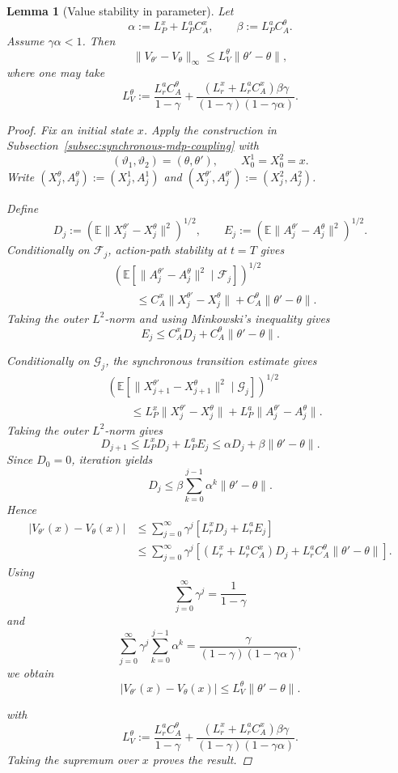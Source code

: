 \documentclass{article}
\newtheorem{lem}[thm]{Lemma}
\theoremstyle{definition}
\theoremstyle{remark}
\theoremstyle{mystyle}
\newcommand{\1}{\mathbbm{1}}
\begin{document}
\begin{lem}[Value stability in parameter]
Let
\[
\alpha:=L_P^x+L_P^aC_A^x,
\qquad
\beta:=L_P^aC_A^\theta.
\]
Assume \(\gamma\alpha<1\). Then
\[
\|V_{\theta'}-V_\theta\|_\infty
\le
L_V^\theta\|\theta'-\theta\|,
\tag{Vtheta}
\]
where one may take
\[
L_V^\theta
:=
\frac{L_r^aC_A^\theta}{1-\gamma}
+
\frac{(L_r^x+L_r^aC_A^x)\beta\gamma}
{(1-\gamma)(1-\gamma\alpha)}.
\]

\begin{proof}
Fix an initial state \(x\). Apply the construction in
Subsection~\ref{subsec:synchronous-mdp-coupling} with
\[
(\vartheta_1,\vartheta_2)=(\theta,\theta'),
\qquad
X_0^1=X_0^2=x.
\]
Write \((X_j^\theta,A_j^\theta):=(X_j^1,A_j^1)\) and
\((X_j^{\theta'},A_j^{\theta'}):=(X_j^2,A_j^2)\).

Define
\[
D_j:=
\left(\mathbb E\|X_j^{\theta'}-X_j^\theta\|^2\right)^{1/2},
\qquad
E_j:=
\left(\mathbb E\|A_j^{\theta'}-A_j^\theta\|^2\right)^{1/2}.
\]
Conditionally on \(\mathcal F_j\), action-path stability at \(t=T\)
gives
\[
\begin{aligned}
&\left(
\mathbb E\left[
\|A_j^{\theta'}-A_j^\theta\|^2
\mid\mathcal F_j
\right]
\right)^{1/2}
\\
&\qquad\le
C_A^x\|X_j^{\theta'}-X_j^\theta\|
+
C_A^\theta\|\theta'-\theta\|.
\end{aligned}
\]
Taking the outer \(L^2\)-norm and using Minkowski's inequality gives
\[
E_j
\le
C_A^xD_j+C_A^\theta\|\theta'-\theta\|.
\]

Conditionally on \(\mathcal G_j\), the synchronous transition estimate
gives
\[
\begin{aligned}
&\left(
\mathbb E\left[
\|X_{j+1}^{\theta'}-X_{j+1}^\theta\|^2
\mid\mathcal G_j
\right]
\right)^{1/2}
\\
&\qquad\le
L_P^x\|X_j^{\theta'}-X_j^\theta\|
+
L_P^a\|A_j^{\theta'}-A_j^\theta\|.
\end{aligned}
\]
Taking the outer \(L^2\)-norm gives
\[
D_{j+1}
\le
L_P^xD_j+L_P^aE_j
\le
\alpha D_j+\beta\|\theta'-\theta\|.
\]
Since \(D_0=0\), iteration yields
\[
D_j
\le
\beta
\sum_{k=0}^{j-1}\alpha^k
\|\theta'-\theta\|.
\]
Hence
\[
\begin{aligned}
|V_{\theta'}(x)-V_\theta(x)|
&\le
\sum_{j=0}^{\infty}
\gamma^j
\left[
L_r^xD_j+L_r^aE_j
\right]
\\
&\le
\sum_{j=0}^{\infty}
\gamma^j
\left[
(L_r^x+L_r^aC_A^x)D_j
+
L_r^aC_A^\theta\|\theta'-\theta\|
\right].
\end{aligned}
\]
Using
\[
\sum_{j=0}^{\infty}\gamma^j=\frac{1}{1-\gamma}
\]
and
\[
\sum_{j=0}^{\infty}
\gamma^j
\sum_{k=0}^{j-1}\alpha^k
=
\frac{\gamma}{(1-\gamma)(1-\gamma\alpha)},
\]
we obtain
\[
|V_{\theta'}(x)-V_\theta(x)|
\le
L_V^\theta\|\theta'-\theta\|.
\]

with \[
L_V^\theta
:=
\frac{L_r^aC_A^\theta}{1-\gamma}
+
\frac{(L_r^x+L_r^aC_A^x)\beta\gamma}
{(1-\gamma)(1-\gamma\alpha)}.
\]
Taking the supremum over \(x\) proves the result.
\end{proof}
\end{lem}
\end{document}
